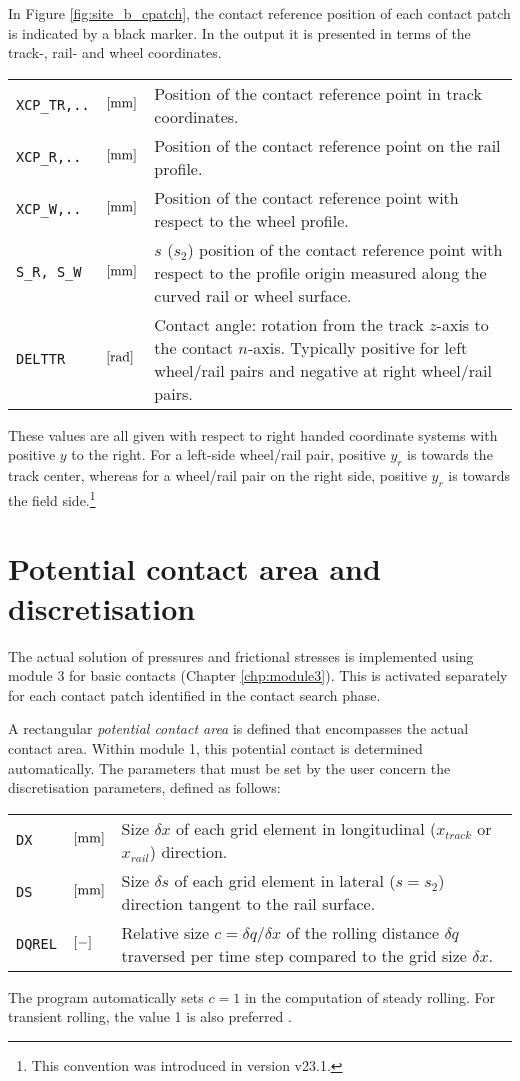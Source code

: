 \documentclass[12pt]{report}
\newenvironment{inputvars}{\vspace{0.4\baselineskip}%

\begin{tabular}{>{\raggedright}p{22mm}p{19mm}p{113mm}}}{
\end{tabular}

}
\newcommand{\inpvar}[3]{{\small\tt #1} & $#2$ & #3 \\[1ex]}
\begin{document}
In Figure \ref{fig:site_b_cpatch}, the contact reference position of each
contact patch is indicated by a black marker. In the output it is presented
in terms of the track-, rail- and wheel coordinates.\label{pg:contact_refpos}
\begin{inputvars}
\inpvar{XCP\_TR,..}{\bunit{mm}}{Position of the contact reference point in
        track coordinates.}
\inpvar{XCP\_R,..}{\bunit{mm}}{Position of the contact reference point on
        the rail profile.}
\inpvar{XCP\_W,..}{\bunit{mm}}{Position of the contact reference point with
        respect to the wheel profile.}
\inpvar{S\_R, S\_W}{\bunit{mm}}{$s$ ($s_2$) position of the contact reference
        point with respect to the profile origin measured along the curved
        rail or wheel surface.}
\inpvar{DELTTR}{\bunit{rad}}{Contact angle: rotation from the track $z$-axis
        to the contact $n$-axis. Typically positive for left wheel/rail pairs
        and negative at right wheel/rail pairs.}
\end{inputvars}
These values are all given with respect to right handed coordinate systems
with positive $y$ to the right. For a left-side wheel/rail pair, positive
$y_r$ is towards the track center, whereas for a wheel/rail pair on the
right side, positive $y_r$ is towards the field side.\footnote{This
convention was introduced in version v23.1.}

\section{Potential contact area and discretisation}
\label{sec:wr_potcon}

The actual solution of pressures and frictional stresses is implemented
using module 3 for basic contacts (Chapter \ref{chp:module3}). This is
activated separately for each contact patch identified in the contact
search phase.

A rectangular {\em potential contact area} is defined that encompasses the
actual contact area. Within module 1, this potential contact is determined
automatically. The parameters that must be set by the user concern the
discretisation parameters, defined as follows:
\begin{inputvars}
\inpvar{DX}{\bunit{mm}}{Size $\delta x$ of each grid element in longitudinal
        ($x_{track}$ or $x_{rail}$) direction.}
\inpvar{DS}{\bunit{mm}}{Size $\delta s$ of each grid element in lateral
        ($s = s_2$) direction tangent to the rail surface.}
\inpvar{DQREL}{\bunit{-}}{Relative size $c=\delta q/\delta x$ of the rolling
        distance $\delta q$ traversed per time step compared to the grid
        size $\delta x$.}
\end{inputvars}
The program automatically sets $c=1$ in the computation of steady rolling.
For transient rolling, the value 1 is also preferred
\cite{Vollebregt2009a-cm2009, Wekken2017a-wiggles}.
\end{document}
